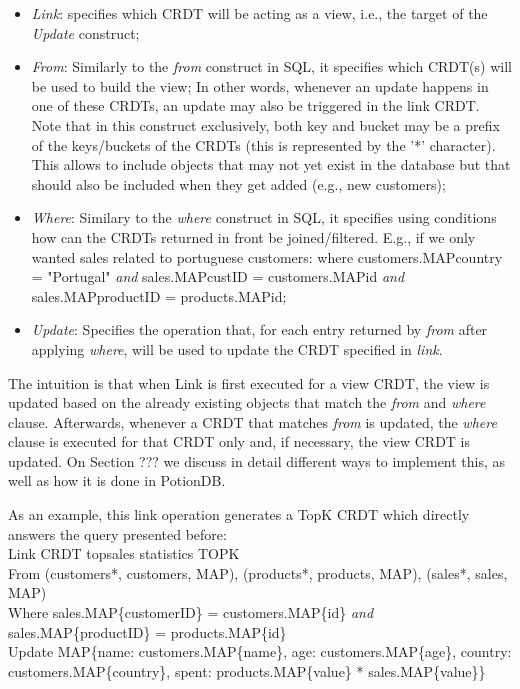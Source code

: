 \documentclass{vldb}
\begin{document}
\begin{itemize}
	\item \emph{Link}: specifies which CRDT will be acting as a view, i.e., the target of the \emph{Update} construct;
	\item \emph{From}: Similarly to the \emph{from} construct in SQL, it specifies which CRDT(s) will be used to build the view;
	In other words, whenever an update happens in one of these CRDTs, an update may also be triggered in the link CRDT.
	Note that in this construct exclusively, both key and bucket may be a prefix of the keys/buckets of the CRDTs (this is represented by the '*' character).
	This allows to include objects that may not yet exist in the database but that should also be included when they get added (e.g., new customers);
	\item \emph{Where}: Similary to the \emph{where} construct in SQL, it specifies using conditions how can the CRDTs returned in front be joined/filtered. E.g., if we only wanted sales related to portuguese customers: where customers.MAP{country} = "Portugal" \emph{and} sales.MAP{custID} = customers.MAP{id} \emph{and} sales.MAP{productID} = products.MAP{id};
	\item \emph{Update}: Specifies the operation that, for each entry returned by \emph{from} after applying \emph{where}, will be used to update the CRDT specified in \emph{link}.
\end{itemize}

The intuition is that when Link is first executed for a view CRDT, the view is updated based on the already existing objects that match the \emph{from} and \emph{where} clause.
Afterwards, whenever a CRDT that matches \emph{from} is updated, the \emph{where} clause is executed for that CRDT only and, if necessary, the view CRDT is updated.
On Section ??? we discuss in detail different ways to implement this, as well as how it is done in PotionDB. %

As an example, this link operation generates a TopK CRDT which directly answers the query presented before:
\\
Link CRDT topsales statistics TOPK \\
From (customers*, customers, MAP), (products*, products, MAP), (sales*, sales, MAP) \\
Where sales.MAP\{customerID\} = customers.MAP\{id\} \emph{and}  sales.MAP\{productID\} = products.MAP\{id\} \\
Update MAP\{name: customers.MAP\{name\}, age: customers.MAP\{age\}, country: customers.MAP\{country\}, spent: products.MAP\{value\} * sales.MAP\{value\}\} \\
\end{document}
